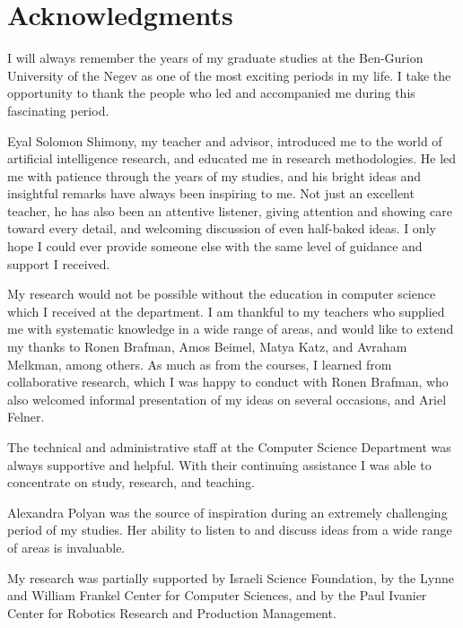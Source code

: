 \section*{Acknowledgments}

I will always remember the years of my graduate studies at the
Ben-Gurion University of the Negev as one of the most exciting
periods in my life. I take the  opportunity to thank the people who
led and accompanied me during this fascinating period.

Eyal Solomon Shimony, my teacher and advisor, introduced me to
the world of artificial intelligence research, and educated me in
research methodologies. He led me with patience through the years of
my studies, and his bright ideas and insightful remarks have always
been inspiring to me. Not just an excellent teacher, he has also
been an attentive listener, giving attention and showing care toward
every detail, and welcoming discussion of even half-baked ideas. I
only hope I could ever provide someone else with the same level of
guidance and support I received.

My research would not be possible without the education in computer
science which I received at the department. I am thankful to my
teachers who supplied me with systematic knowledge in a wide range of
areas, and would like to extend my thanks to Ronen Brafman, Amos
Beimel, Matya Katz, and Avraham Melkman, among others. As much as
from the courses, I learned from collaborative research, which I
was happy to conduct with Ronen Brafman, who also welcomed
informal presentation of my ideas on several occasions, and Ariel
Felner. 

The technical and administrative staff at the Computer Science
Department was always supportive and helpful. With their continuing
assistance I was able to concentrate on study, research, and
teaching.

Alexandra Polyan was the source of inspiration during an
extremely challenging period of my studies. Her ability to listen
to and discuss ideas from a wide range of areas is invaluable.

My research was partially supported by Israeli Science Foundation,
by the Lynne and William Frankel Center for Computer Sciences, and
by the Paul Ivanier Center for Robotics Research and Production
Management. 
